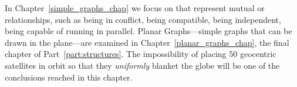 In Chapter~\ref{simple_graphs_chap} we focus on \emph{} that represent mutual or \emph{}
relationships, such as being in conflict, \iffalse being congruent
modulo 17\fi being compatible, being independent, being capable of
running in parallel.  Planar Graphs---simple graphs that can be drawn
in the plane---are examined in Chapter~\ref{planar_graphs_chap}, the
final chapter of Part~\ref{part:structures}.  The impossibility of
placing 50 geocentric satellites in orbit so that they
\emph{uniformly} blanket the globe will be one of the conclusions
reached in this chapter.

\iffalse
This part of the text concludes with Chapter 13
which elaborates the use of the \emph{\idx{state machines}} in program
verification and modeling concurrent computation.
\fi

\endinput
